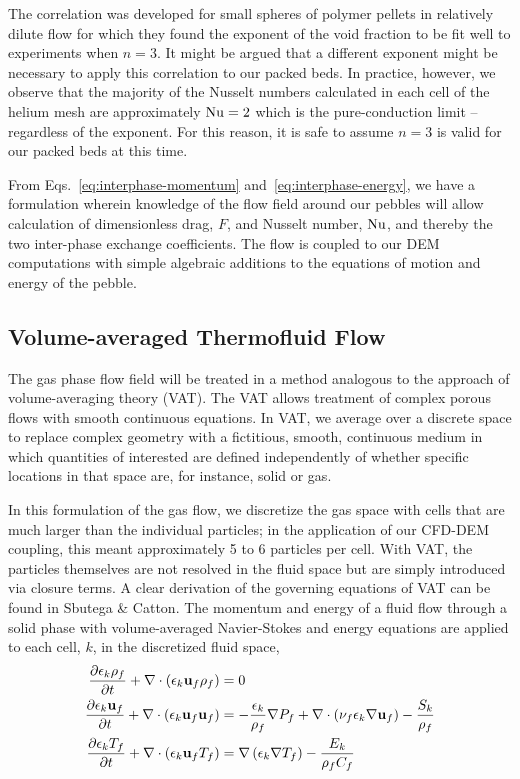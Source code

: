 The correlation was developed for small spheres of polymer pellets in relatively dilute flow for which they found the exponent of the void fraction to be fit well to experiments when $n=3$. It might be argued that a different exponent might be necessary to apply this correlation to our packed beds. In practice, however, we observe that the majority of the Nusselt numbers calculated in each cell of the helium mesh are approximately $\Nu = 2$ which is the pure-conduction limit -- regardless of the exponent. For this reason, it is safe to assume $n=3$ is valid for our packed beds at this time.

From Eqs.~\ref{eq:interphase-momentum} and~\ref{eq:interphase-energy}, we have a formulation wherein knowledge of the flow field around our pebbles will allow calculation of dimensionless drag, $F$, and Nusselt number, $\Nu$,  and thereby the two inter-phase exchange coefficients. The flow is coupled to our DEM computations with simple algebraic additions to the equations of motion and energy of the pebble.




\subsection{Volume-averaged Thermofluid Flow}

The gas phase flow field will be treated in a method analogous to the approach of volume-averaging theory (VAT).\cite{Sbutega2013,whitaker1999method,Tsuji1992} The VAT allows treatment of complex porous flows with smooth continuous equations. In VAT, we average over a discrete space to replace complex geometry with a fictitious, smooth, continuous medium in which quantities of interested are defined independently of whether specific locations in that space are, for instance, solid or gas.

In this formulation of the gas flow, we discretize the gas space with cells that are much larger than the individual particles; in the application of our CFD-DEM coupling, this meant approximately 5 to 6 particles per cell. With VAT, the particles themselves are not resolved in the fluid space but are simply introduced via closure terms.\cite{Sbutega2013,Horvat2006} A clear derivation of the governing equations of VAT can be found in Sbutega \& Catton\cite{Sbutega2013}. The momentum and energy of a fluid flow through a solid phase with volume-averaged Navier-Stokes and energy equations are applied to each cell, $k$, in the discretized fluid space,
\begin{subequations}\label{eq:cfd-equations}
\begin{align}
\pder[\epsilon_k \rho_f]{t} + \nabla\cdot(\epsilon_k \vec{u}_f \rho_f) &= 0\\
\pder[\epsilon_k \vec{u}_f]{t} + \nabla\cdot(\epsilon_k \vec{u}_f \vec{u}_f) &= -\frac{\epsilon_k}{\rho_f}\nabla P_f + \nabla\cdot\left(\nu_f\epsilon_k\nabla \vec{u}_f\right) - \frac{S_k}{\rho_f}\\
\pder[\epsilon_k T_f]{t} + \nabla\cdot(\epsilon_k \vec{u}_f T_f) &= \nabla\left(\epsilon_k\nabla T_f\right)-\frac{E_k}{\rho_fC_f}
\end{align}
\end{subequations}


